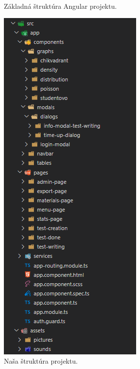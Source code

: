 \begin{figure}[H]
\begin{minipage}[t]{0.48\textwidth}
    \caption{Základná štruktúra Angular projektu.}
    \label{fig:angular-structure}
  \end{minipage}
  \hfill
  \begin{minipage}[t]{0.48\textwidth}
    \centering
    \includegraphics[width=\linewidth]{img/project-structure.png}
    \caption{Naša štruktúra projektu.}
    \label{fig:project-structure}
  \end{minipage}
\end{figure}


